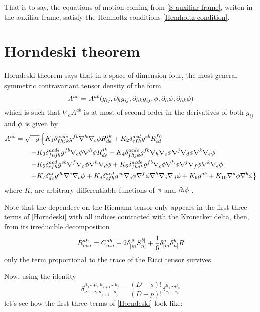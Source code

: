 That is to say, the equations of motion coming from \eqref{S-auxiliar-frame}, writen in the auxiliar frame, satisfy the Hemholtz conditions \eqref{Hemholtz-condition}.


\section{Horndeski theorem}
Horndeski theorem says that in a space of dimension four, the most general symmetric contravariant tensor density of the form
\begin{equation}
  A^{ab}=A^{ab}(g_{ij},\partial_hg_{ij},\partial_{hk}g_{ij},\phi,\partial_h\phi,\partial_{hk}\phi )
\end{equation}
which is such that $\nabla_aA^{ab }$ is at most of second-order in the derivatives of both $g_{ij}$ and $\phi$ is given by
\begin{equation}\label{Horndeski}
\begin{split}
  A^{ab}&=\sqrt{-g}\left\{K_1\delta^{acde}_{fhjk}g^{fb}\nabla^h\nabla_c\phi R^{jk}_{de}+K_2\delta^{acd}_{efh}g^{eb}R^{fh}_{cd}\right.\\
  &\left.\qquad +K_3\delta^{acde}_{fhjk}g^{fb}\nabla_c\phi\nabla^h\phi R^{jk}_{de}+K_4\delta^{acde}_{fhjk}g^{fb}\nabla_h\nabla_c\phi \nabla^j\nabla_d\phi \nabla^k\nabla_e\phi \right.\\
  &\left.\qquad +K_5\delta^{acd}_{efh}g^{eb}\nabla^f\nabla_c\phi \nabla^h\nabla_d\phi +K_6\delta^{acde}_{fhjk}g^{fb}\nabla_c\phi \nabla^h\phi \nabla^j\nabla_f\phi \nabla^k\nabla_e\phi \right.\\
  &\left.\qquad +K_7\delta^{ac}_{de}g^{db}\nabla^{e}\nabla_c\phi+K_8\delta^{acd}_{efh}g^{eb}\nabla_c\phi \nabla^f\phi \nabla^h\nabla_c\nabla_d\phi +K_9g^{ab}+K_{10}\nabla^{a}\phi\nabla^b\phi  \right\}
\end{split}
\end{equation}
where $K_i $ are arbitrary differentiable functions of $\phi$ and $\partial_i\phi$ \cite{Horndeski:1974wa}.

Note that the dependece on the Riemann tensor only appears in the first three terms of \eqref{Horndeski} with all indices contracted with the Kronecker delta, then, from its irreducible decomposition
\begin{equation}
  R^{ab}_{mn}=C^{ab}_{mn}+2\delta^{[a}_{[m}S^{b]}_{n]}+\frac{1}{6}\delta^{a}_{[m}\delta^b_{n]}R
\end{equation}
 only the term proportional to the trace of the Ricci tensor survives.
 
 Now, using the identity
\begin{equation}
{\displaystyle \delta _{\nu _{1}\dots \nu _{s}\,\mu _{s+1}\dots \mu _{p}}^{\mu _{1}\dots \mu _{s}\,\mu _{s+1}\dots \mu _{p}}={\frac {(D-s)!}{(D-p)!}}\delta _{\nu _{1}\dots \nu _{s}}^{\mu _{1}\dots \mu _{s}}}
\end{equation}
 let's see how the first three terms of \eqref{Horndeski} look like:
 
